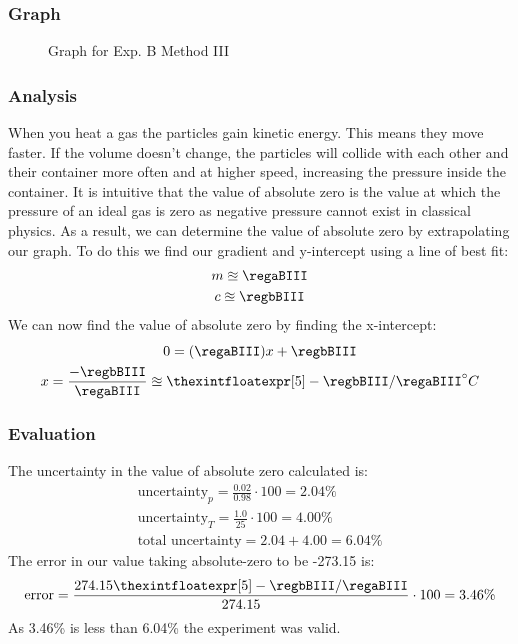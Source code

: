 \subsubsection{Graph}
\begin{figure}[H]
  \centering
  \caption{Graph for Exp. B Method III}
\end{figure}

\subsubsection{Analysis}
When you heat a gas the particles gain kinetic energy.
This means they move faster.
If the volume doesn't change, the particles will collide with each other and their container more often and at higher speed, increasing the pressure inside the container.
It is intuitive that the value of absolute zero is the value at which the pressure of an ideal gas is zero as negative pressure cannot exist in classical physics.
As a result, we can determine the value of absolute zero by extrapolating our graph.
To do this we find our gradient and y-intercept using a line of best fit:
\begin{gather*}
    m \approxeq \regaBIII \\
    c \approxeq \regbBIII
\end{gather*}
We can now find the value of absolute zero by finding the x-intercept:
\begin{gather*}
  0 =  (\regaBIII)x+\regbBIII \\
  x = \frac{-\regbBIII}{\regaBIII} \approxeq {\thexintfloatexpr [5] -\regbBIII/\regaBIII \relax} ^\circ C
\end{gather*}

\subsubsection{Evaluation}
The uncertainty in the value of absolute zero calculated is:
\begin{gather*}
  \text{uncertainty}_{p}=\frac{0.02}{0.98}\cdot 100 = 2.04\% \\
  \text{uncertainty}_{T}=\frac{1.0}{25}\cdot 100 = 4.00\% \\
  \text{total uncertainty}= 2.04 + 4.00 = 6.04\%
\end{gather*}
  The error in our value taking absolute-zero to be -273.15 \cite{wiki:absoluteZero} is:
\begin{gather*}
  \text{error}=\frac{274.15{\thexintfloatexpr [5] -\regbBIII/\regaBIII \relax}}{274.15}\cdot 100 = 3.46\% \\
\end{gather*}
As 3.46\% is less than 6.04\% the experiment was valid.